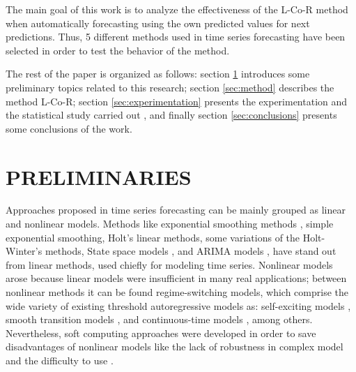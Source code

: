 \documentclass[a4paper,twoside]{article}
\newcommand{\metodo}{L-Co-R}
\begin{document}
The main goal of this work is to analyze the effectiveness of the
{\metodo} method when automatically forecasting using the own
predicted values for next predictions. Thus, 5 different methods used
in time series forecasting have been selected in order to test the
behavior of the method.

The rest of the paper is organized as follows: section
\ref{sec:preliminaries} introduces some preliminary topics related to
this research; section \ref{sec:method} describes the method
{\metodo}; section \ref{sec:experimentation} presents the
experimentation and the statistical study carried out %
, and finally section \ref{sec:conclusions} presents some conclusions of the work.





\section{\uppercase{Preliminaries}}
\label{sec:preliminaries}

\noindent 


Approaches proposed in time series forecasting can be mainly grouped as linear and nonlinear models. Methods like exponential smoothing methods \cite{Winters1960}, simple exponential smoothing, Holt's linear methods, some variations of the Holt-Winter's methods, State space models \cite{Snyder1985}, and ARIMA models \cite{BoxJenk}, have stand out from linear methods, used chiefly for modeling time series. Nonlinear models arose because linear models were insufficient in many real applications; between nonlinear methods it can be found regime-switching models, which comprise the wide variety of existing threshold autoregressive models \cite{Tong1978} as: self-exciting models \cite{Tong1983}, smooth transition models \cite{Chan1986}, and continuous-time models \cite{Brockwell1992157}, among others. Nevertheless, soft computing approaches were developed in order to save disadvantages of nonlinear models like the lack of robustness in complex model and the difficulty to use \cite{Clements2004}.%
\end{document}
